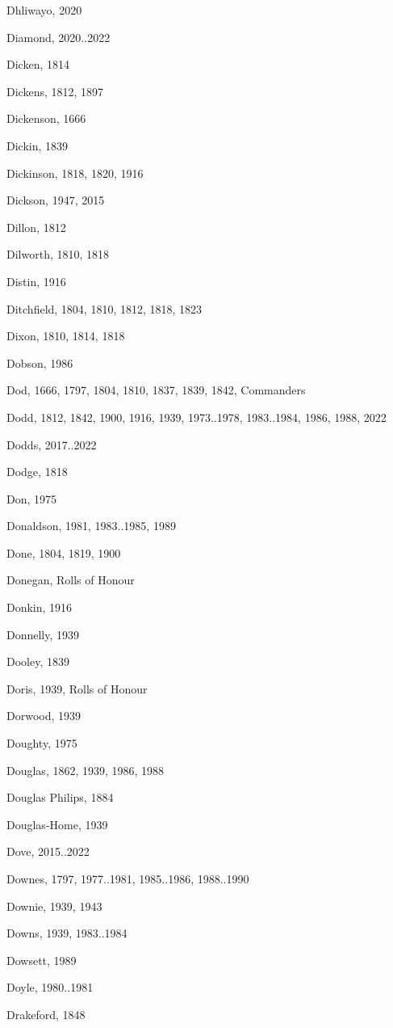 \begin{theindex}
\item Dhliwayo, 2020
\item Diamond, 2020..2022
\item Dicken, 1814
\item Dickens, 1812, 1897
\item Dickenson, 1666
\item Dickin, 1839
\item Dickinson, 1818, 1820, 1916
\item Dickson, 1947, 2015
\item Dillon, 1812
\item Dilworth, 1810, 1818
\item Distin, 1916
\item Ditchfield, 1804, 1810, 1812, 1818, 1823
\item Dixon, 1810, 1814, 1818
\item Dobson, 1986
\item Dod, 1666, 1797, 1804, 1810, 1837, 1839, 1842, Commanders
\item Dodd, 1812, 1842, 1900, 1916, 1939, 1973..1978, 1983..1984, 1986, 1988, 2022
\item Dodds, 2017..2022
\item Dodge, 1818
\item Don, 1975
\item Donaldson, 1981, 1983..1985, 1989
\item Done, 1804, 1819, 1900
\item Donegan, Rolls of Honour
\item Donkin, 1916
\item Donnelly, 1939
\item Dooley, 1839
\item Doris, 1939, Rolls of Honour
\item Dorwood, 1939
\item Doughty, 1975
\item Douglas, 1862, 1939, 1986, 1988
\item Douglas Philips, 1884
\item Douglas-Home, 1939
\item Dove, 2015..2022
\item Downes, 1797, 1977..1981, 1985..1986, 1988..1990
\item Downie, 1939, 1943
\item Downs, 1939, 1983..1984
\item Dowsett, 1989
\item Doyle, 1980..1981
\item Drakeford, 1848

\end{theindex}
